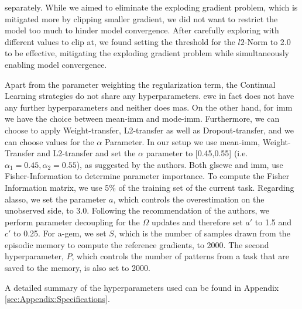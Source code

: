 separately. While we aimed to eliminate the exploding gradient problem, which is mitigated more by clipping smaller gradient, we did not want to restrict the
model too much to hinder model convergence. After carefully exploring with different values to clip at, we found setting the threshold for the $l2$-Norm to 2.0
to be effective, mitigating the exploding gradient problem while simultaneously enabling model convergence. \par
Apart from the parameter weighting the regularization term, the Continual Learning strategies do not share any hyperparameters. \gls{ewc} in fact does not have
any further hyperparameters and neither does \gls{mas}. On the other hand, for \gls{imm} we have the choice between mean-\gls{imm} and mode-\gls{imm}. Furthermore,
we can choose to apply Weight-transfer, L2-transfer as well as Dropout-transfer, and we can choose values for the $\alpha$ Parameter. In our setup we use mean-\gls{imm},
Weight-Transfer and L2-transfer and set the $\alpha$ parameter to [0.45,0.55] (i.e. $\alpha_1 = 0.45, \alpha_2 = 0.55$), as suggested by the authors. Both gls{ewc} and
\gls{imm}, use Fisher-Information to determine parameter importance. To compute the Fisher Information matrix, we use 5\% of the training set of the current task.
Regarding \gls{alasso}, we set the parameter $a$, which controls the overestimation on the unobserved side, to 3.0. Following the recommendation of the authors,
we perform parameter decoupling for the $\Omega$ updates and therefore set $a'$ to 1.5 and $c'$ to 0.25. For \gls{a-gem}, we set $S$, which is the number of samples
drawn from the episodic memory to compute the reference gradients, to 2000. The second hyperparameter, $P$, which controls the number of patterns from a task that
are saved to the memory, is also set to 2000. \par
A detailed summary of the hyperparameters used can be found in Appendix \ref{sec:Appendix:Specifications}.


